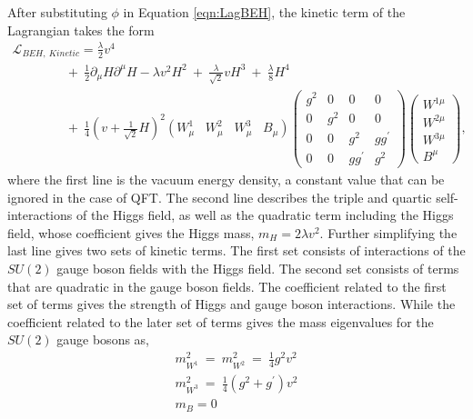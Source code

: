 After substituting $\phi$ in Equation \ref{eqn:LagBEH}, the kinetic term of the Lagrangian takes the form
\begin{equation}
\begin{array}{l}
\mathcal{L}_{BEH,~Kinetic}  = \frac{\lambda}{2}v^{4} \\
\hspace{50pt}  +~\frac{1}{2} \partial_{\mu}H \partial^{\mu}H - \lambda v^{2}H^{2} ~+~ \frac{\lambda}{\sqrt{2}} v H^{3} ~+~ \frac{\lambda}{8} H^4  \\
\hspace{50pt} +~ \frac{1}{4} ( v +\frac{1}{\sqrt{2} } H)^2 (W_{\mu}^{1} \hspace{10pt} W_{\mu}^2 \hspace{10pt} W_{\mu}^3 \hspace{10pt} B_{\mu} ) \begin{pmatrix} g^2 & 0 & 0 & 0 \\ 0 & g^2 & 0 & 0 \\  0  & 0 & g^2 & gg^{'} \\ 0  & 0 & gg^{'} & g^{2} \end{pmatrix} \begin{pmatrix} W^{1\mu}\\ W^{2\mu} \\ W^{3\mu} \\ B^{\mu} \end{pmatrix},
\end{array}
\label{eqn:LagBEHKin}
\end{equation}
where the first line is the vacuum energy density, a constant value that can be ignored in the case of QFT. The second line describes the triple and quartic self-interactions of the Higgs field, as well as the quadratic term including the Higgs field, whose coefficient gives the Higgs mass, $m_{H} = 2\lambda v^2$. Further simplifying the last line gives two sets of kinetic terms. The first set consists of interactions of the $SU(2)$ gauge boson fields with the Higgs field. The second set consists of terms that are quadratic in the gauge boson fields. The coefficient related to the first set of terms gives the strength of Higgs and gauge boson interactions. While the coefficient related to the later set of terms gives the mass eigenvalues for the $SU(2)$ gauge bosons as, 
\begin{equation}
\begin{array}{l}
m_{W^1}^2 ~=~ m_{W^2}^2  ~=~\frac{1}{4}g^2v^2 \\
m_{W^3}^2  ~=~\frac{1}{4}(g^2+g^{'})v^2 \\
m_{B} = 0
\end{array}
\label{eqn:MassesofSU2Bosons}
\end{equation}

